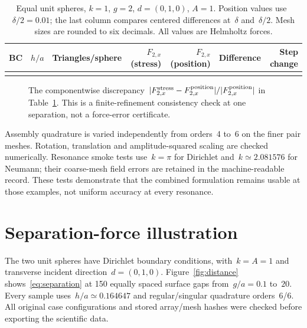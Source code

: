 \documentclass[11pt,a4paper]{article}
\numberwithin{equation}{section}
\begin{document}
\begin{table}[htbp]
\centering
\small
\setlength{\tabcolsep}{4pt}
\begin{tabular}{crrrrrr}
\toprule
BC & $h/a$ & Triangles/sphere & $F_{2,x}$ (stress) & $F_{2,x}$ (position) & Difference & Step change\\
\midrule
{}{data/pair-table.tex}
\bottomrule
\end{tabular}
\caption{Equal unit spheres, $k=1$, $g=2$, $d=(0,1,0)$, $A=1$. Position values use~$\delta/2=0.01$; the last column compares centered differences at~$\delta$ and~$\delta/2$. Mesh sizes are rounded to six decimals. All values are Helmholtz forces.}\label{tab:pair}
\end{table}

\begin{figure}[htbp]
\centering
{}
\caption{The componentwise discrepancy~$|F_{2,x}^{\rm stress}-F_{2,x}^{\rm position}|/|F_{2,x}^{\rm position}|$ in Table~\ref{tab:pair}. This is a finite-refinement consistency check at one separation, not a force-error certificate.}\label{fig:identity}
\end{figure}

\FloatBarrier
Assembly quadrature is varied independently from orders~4 to~6 on the finer pair meshes. Rotation, translation and amplitude-squared scaling are checked numerically. Resonance smoke tests use~$k=\pi$ for Dirichlet and~$k\simeq2.081576$ for Neumann; their coarse-mesh field errors are retained in the machine-readable record. These tests demonstrate that the combined formulation remains usable at those examples, not uniform accuracy at every resonance.

\section{Separation-force illustration}
The two unit spheres have Dirichlet boundary conditions, with~$k=A=1$ and transverse incident direction~$d=(0,1,0)$. Figure~\ref{fig:distance} shows~\eqref{eq:separation} at 150 equally spaced surface gaps from~$g/a=0.1$ to~$20$. Every sample uses~$h/a\simeq0.164647$ and regular/singular quadrature orders~6/6. All original case configurations and stored array/mesh hashes were checked before exporting the scientific data.
\end{document}
